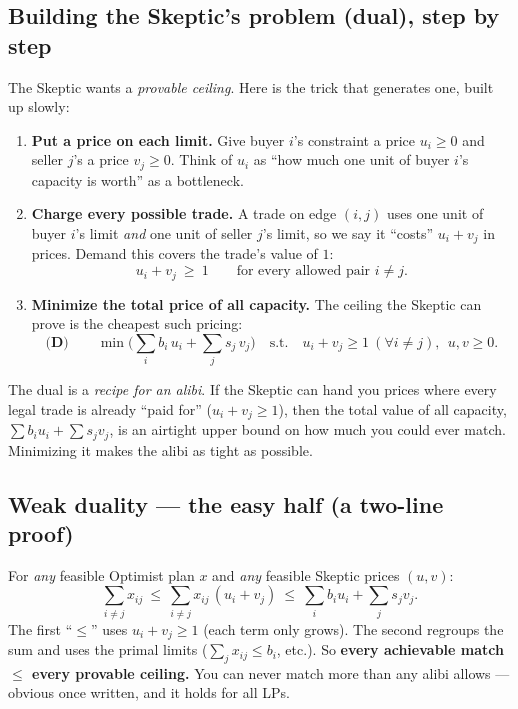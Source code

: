 \subsection{Building the Skeptic's problem (dual), step by step}

The Skeptic wants a \emph{provable ceiling}. Here is the trick that generates one,
built up slowly:

\begin{enumerate}[leftmargin=1.5em]
  \item \textbf{Put a price on each limit.} Give buyer $i$'s constraint a price
        $u_i\ge0$ and seller $j$'s a price $v_j\ge0$. Think of $u_i$ as ``how much
        one unit of buyer $i$'s capacity is worth'' as a bottleneck.
  \item \textbf{Charge every possible trade.} A trade on edge $(i,j)$ uses one
        unit of buyer $i$'s limit \emph{and} one unit of seller $j$'s limit, so we
        say it ``costs'' $u_i+v_j$ in prices. Demand this covers the trade's value
        of $1$:
        \[
        u_i+v_j \ \ge\ 1 \qquad\text{for every allowed pair } i\neq j.
        \]
  \item \textbf{Minimize the total price of all capacity.} The ceiling the Skeptic
        can prove is the cheapest such pricing:
        \[
        \textbf{(D)}\qquad
        \min \Big(\sum_i b_i\,u_i + \sum_j s_j\,v_j\Big)
        \quad\text{s.t.}\quad u_i+v_j\ge1\ (\forall i\neq j),\ \ u,v\ge0.
        \]
\end{enumerate}

\begin{intu}
The dual is a \emph{recipe for an alibi}. If the Skeptic can hand you prices where
every legal trade is already ``paid for'' ($u_i+v_j\ge1$), then the total value of
all capacity, $\sum b_i u_i+\sum s_j v_j$, is an airtight upper bound on how much
you could ever match. Minimizing it makes the alibi as tight as possible.
\end{intu}

\subsection{Weak duality --- the easy half (a two-line proof)}

For \emph{any} feasible Optimist plan $x$ and \emph{any} feasible Skeptic prices
$(u,v)$:
\[
\sum_{i\neq j} x_{ij}
\ \le\ \sum_{i\neq j} x_{ij}\,(u_i+v_j)
\ \le\ \sum_i b_i u_i + \sum_j s_j v_j.
\]
The first ``$\le$'' uses $u_i+v_j\ge1$ (each term only grows). The second regroups
the sum and uses the primal limits ($\sum_j x_{ij}\le b_i$, etc.). So
\textbf{every achievable match $\le$ every provable ceiling.} You can never match
more than any alibi allows --- obvious once written, and it holds for all LPs.

